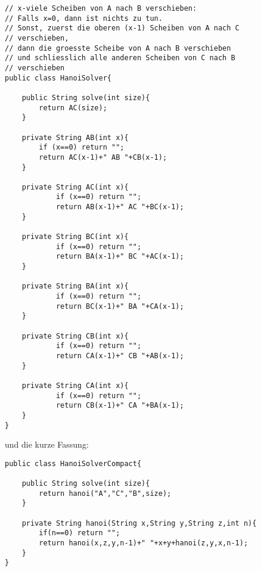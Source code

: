 \begin{bsp}
\begin{rk}
\lstset{language=Java}
\begin{framed}
\begin{lstlisting}
// x-viele Scheiben von A nach B verschieben:
// Falls x=0, dann ist nichts zu tun.
// Sonst, zuerst die oberen (x-1) Scheiben von A nach C
// verschieben,
// dann die groesste Scheibe von A nach B verschieben
// und schliesslich alle anderen Scheiben von C nach B
// verschieben
public class HanoiSolver{

    public String solve(int size){
        return AC(size);
    }

    private String AB(int x){
        if (x==0) return "";
        return AC(x-1)+" AB "+CB(x-1);
    }

    private String AC(int x){
            if (x==0) return "";
            return AB(x-1)+" AC "+BC(x-1);
    }

    private String BC(int x){
            if (x==0) return "";
            return BA(x-1)+" BC "+AC(x-1);
    }

    private String BA(int x){
            if (x==0) return "";
            return BC(x-1)+" BA "+CA(x-1);
    }

    private String CB(int x){
            if (x==0) return "";
            return CA(x-1)+" CB "+AB(x-1);
    }

    private String CA(int x){
            if (x==0) return "";
            return CB(x-1)+" CA "+BA(x-1);
    }
}
\end{lstlisting}
\end{framed}
und die kurze Fassung:
\begin{framed}
\begin{lstlisting}
public class HanoiSolverCompact{

    public String solve(int size){
        return hanoi("A","C","B",size);
    }

    private String hanoi(String x,String y,String z,int n){
        if(n==0) return "";
        return hanoi(x,z,y,n-1)+" "+x+y+hanoi(z,y,x,n-1);
    }
}
\end{lstlisting}
\end{framed}

%
%
%
%
%
%
\end{rk}
\end{bsp}


